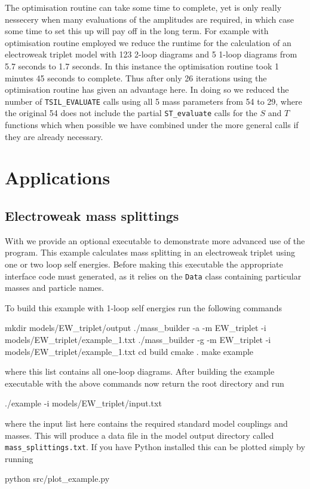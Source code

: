 The optimisation routine can take some time to complete, yet is only really nessecery when many evaluations of the amplitudes are required, in which case some time to set this up will pay off in the long term.  For example with optimisation routine employed we reduce the runtime for the calculation of an electroweak triplet model with 123 2-loop diagrams and 5 1-loop diagrams from 5.7 seconds to 1.7 seconds.  In this instance the optimisation routine took 1 minutes 45 seconds to complete.  Thus after only 26 iterations using the optimisation routine has given an advantage here.  In doing so we reduced the number of \lstinline{TSIL_EVALUATE} calls using all 5 mass parameters from 54 to 29, where the original 54 does not include the partial \lstinline{ST_evaluate} calls for the $S$ and $T$ functions which when possible we have combined under the more general calls if they are already necessary.


\section{Applications}

\subsection{Electroweak mass splittings}

With \mb we provide an optional executable to demonstrate more advanced use of the program.  This example calculates mass splitting in an electroweak triplet using one or two loop self energies.  Before making this executable the appropriate \tsil interface code must generated, as it relies on the \lstinline{Data} class containing particular masses and particle names.

To build this example with 1-loop self energies run the following commands
\begin{lstterm}
mkdir models/EW_triplet/output
./mass_builder -a -m EW_triplet -i models/EW_triplet/example_1.txt
./mass_builder -g -m EW_triplet -i models/EW_triplet/example_1.txt
cd build
cmake .
make example
\end{lstterm}
where this list contains all one-loop diagrams.  After building the example executable with the above commands now return the root directory and run
\begin{lstterm}
./example -i models/EW_triplet/input.txt
\end{lstterm}
where the input list here contains the required standard model couplings and masses.  This will produce a data file in the model output directory called \lstinline{mass_splittings.txt}.  If you have Python installed this can be plotted simply by running
\begin{lstterm}
python src/plot_example.py
\end{lstterm}

